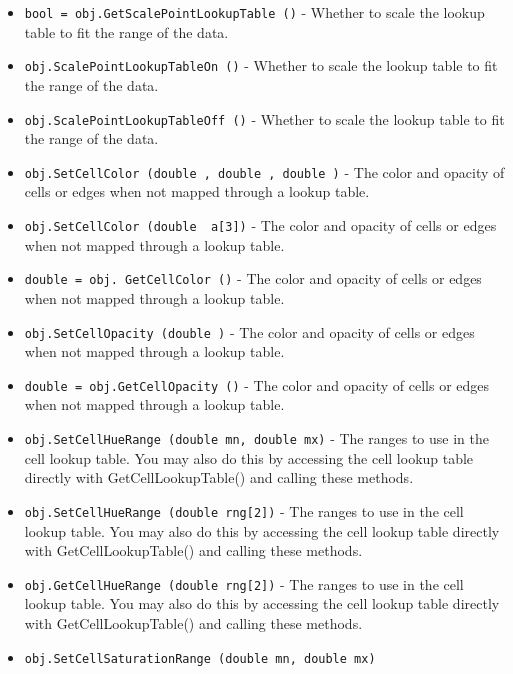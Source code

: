 \begin{itemize}
\item  \verb|bool = obj.GetScalePointLookupTable ()| -  Whether to scale the lookup table to fit the range of the data.

\item  \verb|obj.ScalePointLookupTableOn ()| -  Whether to scale the lookup table to fit the range of the data.

\item  \verb|obj.ScalePointLookupTableOff ()| -  Whether to scale the lookup table to fit the range of the data.

\item  \verb|obj.SetCellColor (double , double , double )| -  The color and opacity of cells or edges when not mapped through
 a lookup table.

\item  \verb|obj.SetCellColor (double  a[3])| -  The color and opacity of cells or edges when not mapped through
 a lookup table.

\item  \verb|double = obj. GetCellColor ()| -  The color and opacity of cells or edges when not mapped through
 a lookup table.

\item  \verb|obj.SetCellOpacity (double )| -  The color and opacity of cells or edges when not mapped through
 a lookup table.

\item  \verb|double = obj.GetCellOpacity ()| -  The color and opacity of cells or edges when not mapped through
 a lookup table.

\item  \verb|obj.SetCellHueRange (double mn, double mx)| -  The ranges to use in the cell lookup table.
 You may also do this by accessing the cell lookup table directly
 with GetCellLookupTable() and calling these methods.

\item  \verb|obj.SetCellHueRange (double rng[2])| -  The ranges to use in the cell lookup table.
 You may also do this by accessing the cell lookup table directly
 with GetCellLookupTable() and calling these methods.

\item  \verb|obj.GetCellHueRange (double rng[2])| -  The ranges to use in the cell lookup table.
 You may also do this by accessing the cell lookup table directly
 with GetCellLookupTable() and calling these methods.

\item  \verb|obj.SetCellSaturationRange (double mn, double mx)|


\end{itemize}

